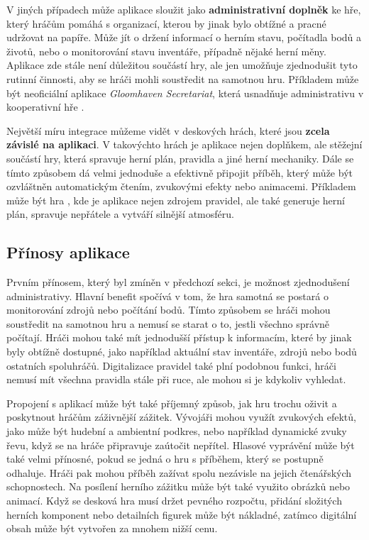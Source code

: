 V jiných případech může aplikace sloužit jako \textbf{administrativní doplněk} ke hře, který hráčům pomáhá s organizací, kterou by jinak bylo obtížné a pracné udržovat na papíře. Může jít o držení informací o herním stavu, počítadla bodů a životů, nebo o monitorování stavu inventáře, případně nějaké herní měny. Aplikace zde stále není důležitou součástí hry, ale jen umožňuje zjednodušit tyto rutinní činnosti, aby se hráči mohli soustředit na samotnou hru. Příkladem může být neoficiální aplikace \textit{Gloomhaven Secretariat}, která usnadňuje administrativu v kooperativní hře .

Největší míru integrace můžeme vidět v deskových hrách, které jsou \textbf{zcela závislé na aplikaci}. V takovýchto hrách je aplikace nejen doplňkem, ale stěžejní součástí hry, která spravuje herní plán, pravidla a jiné herní mechaniky. Dále se tímto způsobem dá velmi jednoduše a efektivně připojit příběh, který může být ozvláštněn automatickým čtením, zvukovými efekty nebo animacemi. Příkladem může být hra , kde je aplikace nejen zdrojem pravidel, ale také generuje herní plán, spravuje nepřátele a vytváří silnější atmosféru.

\subsection{Přínosy aplikace}
\label{subsec:apps_app_benefits}

Prvním přínosem, který byl zmíněn v předchozí sekci, je možnost zjednodušení administrativy. Hlavní benefit spočívá v tom, že hra samotná se postará o monitorování zdrojů nebo počítání bodů. Tímto způsobem se hráči mohou soustředit na samotnou hru a nemusí se starat o to, jestli všechno správně počítají. Hráči mohou také mít jednodušší přístup k informacím, které by jinak byly obtížně dostupné, jako například aktuální stav inventáře, zdrojů nebo bodů ostatních spoluhráčů. Digitalizace pravidel také plní podobnou funkci, hráči nemusí mít všechna pravidla stále při ruce, ale mohou si je kdykoliv vyhledat.

Propojení s aplikací může být také příjemný způsob, jak hru trochu oživit a poskytnout hráčům záživnější zážitek. Vývojáři mohou využít zvukových efektů, jako může být hudební a ambientní podkres, nebo například dynamické zvuky řevu, když se na hráče připravuje zaútočit nepřítel. Hlasové vyprávění může být také velmi přínosné, pokud se jedná o hru s příběhem, který se postupně odhaluje. Hráči pak mohou příběh zažívat spolu nezávisle na jejich čtenářských schopnostech. Na posílení herního zážitku může být také využito obrázků nebo animací. Když se desková hra musí držet pevného rozpočtu, přidání složitých herních komponent nebo detailních figurek může být nákladné, zatímco digitální obsah může být vytvořen za mnohem nižší cenu.

